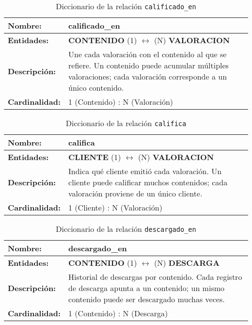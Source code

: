 \begin{longtable}{|p{3.5cm}|p{10cm}|}
\caption{Diccionario de la relación \texttt{calificado\_en}}
\label{tab:rel_calificado_en} \\ \hline
\textbf{Nombre:} & calificado\_en \\ \hline
\textbf{Entidades:} & \textbf{CONTENIDO} (1) $\longleftrightarrow$ (N) \textbf{VALORACION} \\ \hline
\textbf{Descripción:} & Une cada valoración con el contenido al que se refiere.  
Un contenido puede acumular múltiples valoraciones; cada valoración corresponde a un único contenido. \\ \hline
\textbf{Cardinalidad:} & 1 (Contenido) : N (Valoración) \\ \hline
\end{longtable}

\newpage
\begin{longtable}{|p{3.5cm}|p{10cm}|}
\caption{Diccionario de la relación \texttt{califica}}
\label{tab:rel_califica} \\ \hline
\textbf{Nombre:} & califica \\ \hline
\textbf{Entidades:} & \textbf{CLIENTE} (1) $\longleftrightarrow$ (N) \textbf{VALORACION} \\ \hline
\textbf{Descripción:} & Indica qué cliente emitió cada valoración.  
Un cliente puede calificar muchos contenidos; cada valoración proviene de un único cliente. \\ \hline
\textbf{Cardinalidad:} & 1 (Cliente) : N (Valoración) \\ \hline
\end{longtable}

\begin{longtable}{|p{3.5cm}|p{10cm}|}
\caption{Diccionario de la relación \texttt{descargado\_en}}
\label{tab:rel_descargado_en} \\ \hline
\textbf{Nombre:} & descargado\_en \\ \hline
\textbf{Entidades:} & \textbf{CONTENIDO} (1) $\longleftrightarrow$ (N) \textbf{DESCARGA} \\ \hline
\textbf{Descripción:} & Historial de descargas por contenido.  
Cada registro de descarga apunta a un contenido; un mismo contenido puede ser descargado muchas veces. \\ \hline
\textbf{Cardinalidad:} & 1 (Contenido) : N (Descarga) \\ \hline
\end{longtable}

